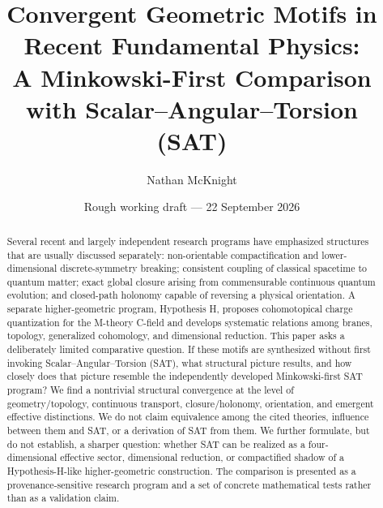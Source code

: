 \documentclass[11pt]{article}
\title{Convergent Geometric Motifs in Recent Fundamental Physics:\\A Minkowski-First Comparison with Scalar--Angular--Torsion (SAT)}
\author{Nathan McKnight}
\date{Rough working draft --- 22 September 2026}
\begin{document}
\maketitle
\begin{center}\end{center}

\begin{abstract}
Several recent and largely independent research programs have emphasized structures that are usually discussed separately: non-orientable compactification and lower-dimensional discrete-symmetry breaking; consistent coupling of classical spacetime to quantum matter; exact global closure arising from commensurable continuous quantum evolution; and closed-path holonomy capable of reversing a physical orientation. A separate higher-geometric program, Hypothesis H, proposes cohomotopical charge quantization for the M-theory C-field and develops systematic relations among branes, topology, generalized cohomology, and dimensional reduction. This paper asks a deliberately limited comparative question. If these motifs are synthesized without first invoking Scalar--Angular--Torsion (SAT), what structural picture results, and how closely does that picture resemble the independently developed Minkowski-first SAT program? We find a nontrivial structural convergence at the level of geometry/topology, continuous transport, closure/holonomy, orientation, and emergent effective distinctions. We do not claim equivalence among the cited theories, influence between them and SAT, or a derivation of SAT from them. We further formulate, but do not establish, a sharper question: whether SAT can be realized as a four-dimensional effective sector, dimensional reduction, or compactified shadow of a Hypothesis-H-like higher-geometric construction. The comparison is presented as a provenance-sensitive research program and a set of concrete mathematical tests rather than as a validation claim.
\end{abstract}
\end{document}
